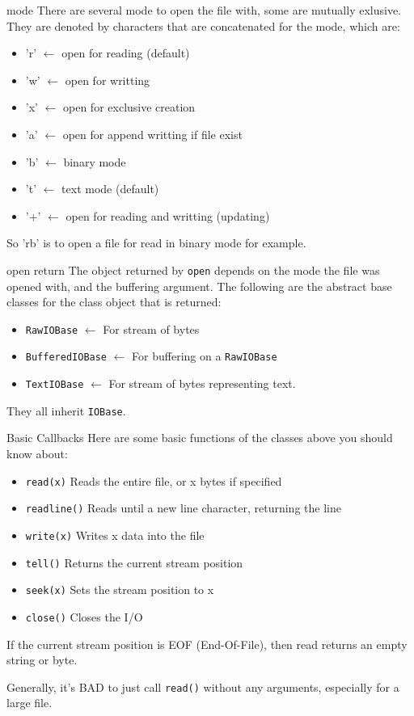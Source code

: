 \begin{frame}[containsverbatim]{mode}
  There are several mode to open the file with, some are mutually exlusive. They are denoted by characters that are concatenated for the mode, which are:
  \begin{itemize}
    \item 'r' $\leftarrow$ open for reading (default)
    \item 'w' $\leftarrow$ open for writting
    \item 'x' $\leftarrow$ open for exclusive creation
    \item 'a' $\leftarrow$ open for append writting if file exist
    \item 'b' $\leftarrow$ binary mode
    \item 't' $\leftarrow$ text mode (default)
    \item '+' $\leftarrow$ open for reading and writting (updating)
  \end{itemize}

  So 'rb' is to open a file for read in binary mode for example.
\end{frame}

\begin{frame}[containsverbatim]{open return}
  The object returned by \verb|open| depends on the mode the file was opened with, and the buffering argument.
  The following are the abstract base classes for the class object that is returned:
  \begin{itemize}
    \item \verb|RawIOBase| $\leftarrow$ For stream of bytes
    \item \verb|BufferedIOBase| $\leftarrow$ For buffering on a \verb|RawIOBase|
    \item \verb|TextIOBase| $\leftarrow$ For stream of bytes representing text.
  \end{itemize}
  They all inherit \verb|IOBase|.
\end{frame}

\begin{frame}[containsverbatim]{Basic Callbacks}
  Here are some basic functions of the classes above you should know about:
  \begin{itemize}
    \item \verb|read(x)| Reads the entire file, or x bytes if specified
    \item \verb|readline()| Reads until a new line character, returning the line
    \item \verb|write(x)| Writes x data into the file
    \item \verb|tell()| Returns the current stream position
    \item \verb|seek(x)| Sets the stream position to x
    \item \verb|close()| Closes the I/O
  \end{itemize}

  If the current stream position is EOF (End-Of-File), then read returns an empty string or byte.

  Generally, it's BAD to just call \verb|read()| without any arguments, especially for a large file.
\end{frame}

